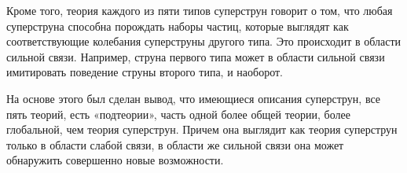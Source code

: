 Кроме того, теория каждого из пяти типов суперструн говорит о том, что любая суперструна способна порождать наборы частиц, которые выглядят как соответствующие колебания суперструны другого типа.
Это происходит в области сильной связи. Например, струна первого типа может в области сильной связи имитировать поведение струны второго типа, и наоборот. 

На основе этого был сделан вывод, что имеющиеся описания суперструн, все пять теорий, есть «подтеории», часть одной более общей теории, более глобальной, чем  теория суперструн.
Причем она выглядит как теория суперструн только в области слабой связи, в области же сильной связи она может обнаружить совершенно новые возможности.

